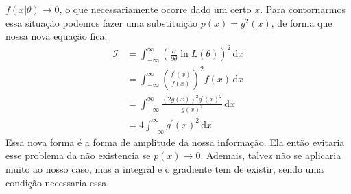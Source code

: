 \(f(x|\theta) \to 0 \), o que necessariamente ocorre dado um certo \(x\). Para contornarmos essa
situação podemos fazer uma substituição \(p(x)=g^{2}(x)\), de forma que nossa nova equação fica:
\begin{align}
    \mathcal{I} &=\int_{-\infty}^{\infty} (\frac{\partial }{\partial \theta } \ln L(\theta ))^{2}  \,\mathrm{d}x\\
    &=\int_{-\infty}^{\infty} (\frac{f^\prime (x) }{f(x)})^{2} f(x)  \,\mathrm{d}x\\
    &=\int_{-\infty}^{\infty} \frac{(2g(x))^{2} g^\prime(x)^{2} }{g(x)^{2}}  \,\mathrm{d}x\\
    &=4\int_{-\infty}^{\infty} g^\prime (x)^{2}   \,\mathrm{d}x 
\end{align}
Essa nova forma é a forma de amplitude da nossa informação. Ela então evitaria esse problema da não
existencia se \(p(x)\to 0\). Ademais, talvez não se aplicaria muito ao nosso caso, mas a integral e
o gradiente tem de existir, sendo uma condição necessaria essa.